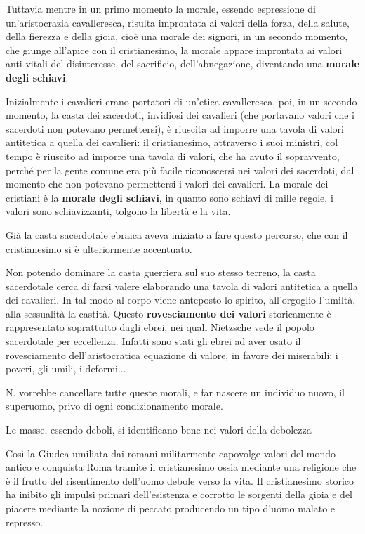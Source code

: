 \documentclass[a4paper, twoside, titlepage]{book}
\begin{document}
Tuttavia mentre in un primo momento la morale, essendo espressione di un'aristocrazia cavalleresca, risulta improntata ai valori della forza, della salute, della fierezza e della gioia, cioè una morale dei signori, in un secondo momento, che giunge all'apice con il cristianesimo, la morale appare improntata ai valori anti-vitali del disinteresse, del sacrificio, dell'abnegazione, diventando una \textbf{morale degli schiavi}.

Inizialmente i cavalieri erano portatori di un'etica cavalleresca, poi, in un secondo momento, la casta dei sacerdoti, invidiosi dei cavalieri (che portavano valori che i sacerdoti non potevano permettersi), è riuscita ad imporre una tavola di valori antitetica a quella dei cavalieri: il cristianesimo, attraverso i suoi ministri, col tempo è riuscito ad imporre una tavola di valori, che ha avuto il sopravvento, perché per la gente comune era più facile riconoscersi nei valori dei sacerdoti, dal momento che non potevano permettersi i valori dei cavalieri.
La morale dei cristiani è la \textbf{morale degli schiavi}, in quanto sono schiavi di mille regole, i valori sono schiavizzanti, tolgono la libertà e la vita.

Già la casta sacerdotale ebraica aveva iniziato a fare questo percorso, che con il cristianesimo si è ulteriormente accentuato.

Non potendo dominare la casta guerriera sul suo stesso terreno, la casta sacerdotale cerca di farsi valere elaborando una tavola di valori antitetica a quella dei cavalieri. In tal modo al corpo viene anteposto lo spirito, all'orgoglio l'umiltà, alla sessualità la castità. Questo \textbf{rovesciamento dei valori} storicamente è rappresentato soprattutto dagli ebrei, nei quali Nietzsche vede il popolo sacerdotale per eccellenza. Infatti sono stati gli ebrei ad aver osato il rovesciamento dell'aristocratica equazione di valore, in favore dei miserabili: i poveri, gli umili, i deformi...

N. vorrebbe cancellare tutte queste morali, e far nascere un individuo nuovo, il superuomo, privo di ogni condizionamento morale.

Le masse, essendo deboli, si identificano bene nei valori della debolezza

Così la Giudea umiliata dai romani militarmente capovolge valori del mondo antico e conquista Roma tramite il cristianesimo ossia mediante una religione che è il frutto del risentimento dell'uomo debole verso la vita. Il cristianesimo storico ha inibito gli impulsi primari dell'esistenza e corrotto le sorgenti della gioia e del piacere mediante la nozione di peccato producendo un tipo d'uomo malato e represso.
\end{document}

